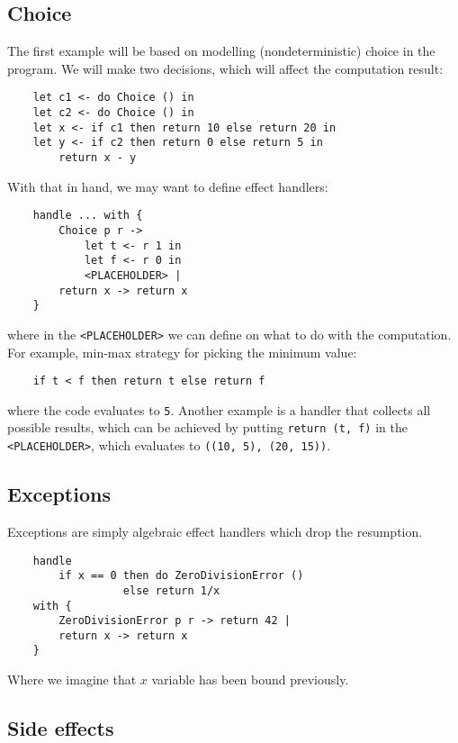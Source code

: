 \documentclass{article}
\theoremstyle{definition}
\theoremstyle{lemma}
\theoremstyle{observation}
\theoremstyle{theorem}
\begin{document}
    \subsection{Choice}
    \label{sec:choice-example}

    The first example will be based on modelling (nondeterministic) choice
    in the program. We will make two decisions, which will affect the computation
    result:

    \begin{verbatim}
    let c1 <- do Choice () in
    let c2 <- do Choice () in
    let x <- if c1 then return 10 else return 20 in
    let y <- if c2 then return 0 else return 5 in
        return x - y
    \end{verbatim}
    With that in hand, we may want to define effect handlers:

    \begin{verbatim}
    handle ... with {
        Choice p r ->
            let t <- r 1 in
            let f <- r 0 in
            <PLACEHOLDER> |
        return x -> return x
    }
    \end{verbatim}
    where in the \verb!<PLACEHOLDER>! we can define on what to do with the
    computation. For example, min-max strategy for picking the minimum value:

    \begin{verbatim}
    if t < f then return t else return f
    \end{verbatim}
    where the code evaluates to \verb!5!. Another example is a handler that
    collects all possible results, which can be achieved by putting
    \verb!return (t, f)! in the \verb!<PLACEHOLDER>!, which evaluates to \verb!((10, 5), (20, 15))!.

    \subsection{Exceptions}

    Exceptions are simply algebraic effect handlers which drop the resumption.

    \begin{verbatim}
    handle
        if x == 0 then do ZeroDivisionError ()
                  else return 1/x
    with {
        ZeroDivisionError p r -> return 42 |
        return x -> return x
    }
    \end{verbatim}
    Where we imagine that $x$ variable has been bound previously.

    \subsection{Side effects}
\end{document}
